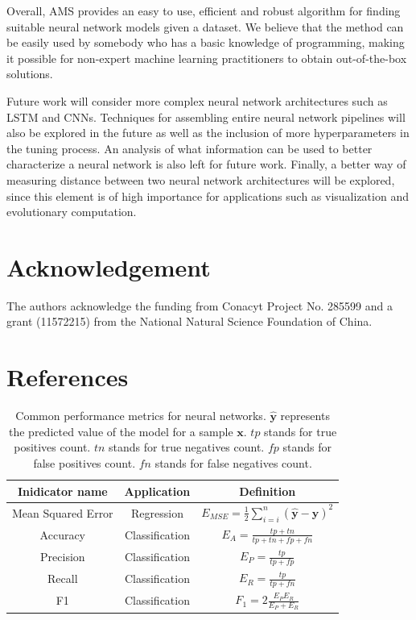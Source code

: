 \documentclass[12pt]{elsart}%
\begin{document}
Overall, AMS provides an easy to use, efficient and robust algorithm for finding suitable neural network models given a dataset. We believe that the method can be easily used by somebody who has a basic knowledge of programming, making it possible for non-expert machine learning practitioners to obtain out-of-the-box solutions.

Future work will consider more complex neural network architectures such as LSTM and CNNs. Techniques for assembling entire neural network pipelines will also be explored in the future as well as the inclusion of more hyperparameters in the tuning process. An analysis of what information can be used to better characterize a neural network is also left for future work. Finally, a better way of measuring distance between two neural network architectures will be explored, since this element is of high importance for applications such as visualization and evolutionary computation.


\section*{Acknowledgement}
The authors acknowledge the funding from Conacyt Project No. 285599 and a grant (11572215) from the National Natural Science Foundation of China.

\section*{References}





\clearpage


\begin{table}[!htb]
\begin{center}
\begin{tabular}{| c | c | c |}
\hline
Inidicator name & Application & Definition\\
\hline
Mean Squared Error & Regression & $E_{MSE} = \frac{1}{2}\sum_{i=i}^{n} \left( \mathbf{\hat{y}} - \mathbf{y} \right)^2$\\
Accuracy & Classification & $E_{A} = \frac{tp+tn}{tp+tn + fp + fn}$ \\
Precision & Classification & $E_{P} = \frac{tp}{tp+fp}$ \\
Recall & Classification & $E_{R} = \frac{tp}{tp+fn}$\\
F1 & Classification & $F_{1} = 2 \frac{E_{P} E_{R}}{E_{P} + E_{R}}$\\
\hline
\end{tabular}
\end{center}
\caption{Common performance metrics for neural networks. $\mathbf{\hat{y}}$ represents the predicted value of the model for a sample $\mathbf{x}$. $tp$ stands for true positives count. $tn$ stands for true negatives count. $fp$ stands for false positives count. $fn$ stands for false negatives count.}
\label{table:performance_metrics}
\end{table}
\end{document}
